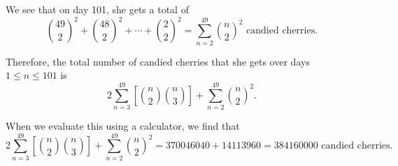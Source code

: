 \documentclass[12pt]{article}
\begin{document}
\begin{solution}{4}
    \\\\
    We see that on day 101, she gets a total of
    \begin{equation*}
        \binom{49}2^2 + \binom{48}2^2 + \cdots + \binom22^2=\sum_{n=2}^{49} {\binom n2}^2 \text{ candied cherries.}
    \end{equation*}

    Therefore, the total number of candied cherries that she gets over days $1\le n \le 101$ is
    \begin{equation*}
        2\sum_{n=3}^{49} \left[\binom n2\binom n3\right] + \sum_{n=2}^{49} {\binom n2}^2.
    \end{equation*}

    When we evaluate this using a calculator, we find that
    \begin{equation*}
        2\sum_{n=3}^{49} \left[\binom n2\binom n3\right] +
                         \sum_{n=2}^{49} {\binom n2}^2
        = 370046040 + 14113960
        = \boxed{384160000\text{ candied cherries}}.
    \end{equation*}

\end{solution}
\end{document}
